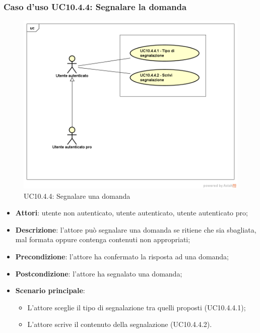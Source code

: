 \subsubsection{Caso d'uso UC10.4.4: Segnalare la domanda}
\label{UC10.4.4}
\begin{figure}
	\centering
	\includegraphics[scale=0.5]{UML/UC10_4_4.png}
	\caption{UC10.4.4: Segnalare una domanda}
\end{figure}
\FloatBarrier
	\begin{itemize}
		\item \textbf{Attori}: utente non autenticato, utente autenticato, utente autenticato pro;
		\item \textbf{Descrizione}: l'attore può segnalare una domanda se ritiene che sia sbagliata, mal formata oppure contenga contenuti non appropriati;
		\item \textbf{Precondizione}: l'attore ha confermato la risposta ad una domanda;
		\item \textbf{Postcondizione}: l'attore ha segnalato una domanda;
		\item \textbf{Scenario principale}:		
				\begin{itemize}
					\item L'attore sceglie il tipo di segnalazione tra quelli proposti (UC10.4.4.1);
					\item L'attore scrive il contenuto della segnalazione (UC10.4.4.2).
				\end{itemize}
	\end{itemize}
